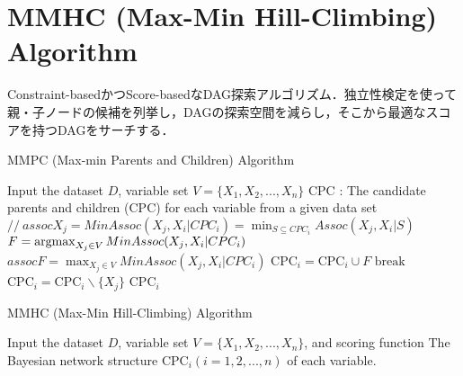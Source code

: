 \documentclass[dvipdfmx]{jsarticle}
\begin{document}
\section{MMHC (Max-Min Hill-Climbing) Algorithm}
Constraint-basedかつScore-basedなDAG探索アルゴリズム．独立性検定を使って親・子ノードの候補を列挙し，DAGの探索空間を減らし，そこから最適なスコアを持つDAGをサーチする．

\begin{algorithm}[t]                      
\caption{MMPC (Max-min Parents and Children) Algorithm}
\label{alg:optimize_regression}                          
\begin{algorithmic}[1]
\REQUIRE Input the dataset $D$, variable set $V=\{ X_1, X_2, ..., X_n \}$
\ENSURE CPC : The candidate parents and children (CPC) for each variable from a given data set
    \STATE {}
        \STATE {}
        \STATE $// \ assoc X_j = MinAssoc(X_j, X_i | CPC_i) = \min_{S \subseteq CPC_i} Assoc(X_j, X_i | S)$
        \STATE $F = \mathop{\mathrm{argmax}}_{X_j \in V} MinAssoc(X_j, X_i | CPC_i)$
        \STATE $assoc F = \max_{X_j \in V} MinAssoc(X_j, X_i | CPC_i)$
            \STATE $\text{CPC}_i= \text{CPC}_i \cup F$
        \ELSE
            \STATE $\text{break}$
        \ENDIF
    \ENDFOR
            \STATE  $\text{CPC}_i= \text{CPC}_i \backslash \{X_j \}$
        \ENDIF
    \RETURN $\text{CPC}_i$
    \ENDFOR
\ENDFOR
\end{algorithmic}
\end{algorithm}


\begin{algorithm}[t]                      
\caption{MMHC (Max-Min Hill-Climbing) Algorithm}
\label{alg:MMHC}                          
\begin{algorithmic}[1]
\REQUIRE Input the dataset $D$, variable set $V=\{ X_1, X_2, ..., X_n \}$, and scoring function
\ENSURE The Bayesian network structure 
\STATE {} $\text{CPC}_i (i=1, 2, ..., n)$ of each variable.
\STATE {}\\
\RETURN {}
\end{algorithmic}
\end{algorithm}
\end{document}
